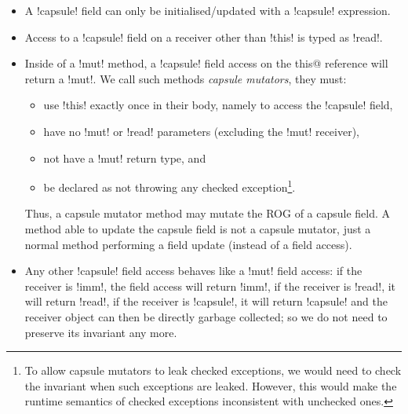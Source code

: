 \begin{itemize}
	\item A \Q!capsule! field can only be initialised/updated with a \Q!capsule! expression.
\item Access to a \Q!capsule! field on a receiver other than \Q!this! is typed as \Q!read!.
\item 
Inside of a \Q!mut! method,
a \Q!capsule! field access 
on the \Q@mut this@ reference will return a \Q!mut!.
We call such methods \emph{capsule mutators}, they must:
\begin{itemize}
		\item use \Q!this! exactly once in their body, namely to access the \Q!capsule! field,
		\item have no \Q!mut! or \Q!read! parameters (excluding the \Q!mut! receiver),
		\item not have a \Q!mut! return type, and
		\item be declared as not throwing any checked exception\footnote{To allow capsule mutators to leak checked exceptions, we would need to check the invariant when such exceptions are leaked. However, this would make the runtime semantics of checked exceptions inconsistent with unchecked ones.}.
	\end{itemize}	
Thus, a capsule mutator method may mutate the ROG of a capsule field. A method able to update the capsule field is not a capsule mutator, just a normal method performing a \Q@capsule@ field update (instead of a field access).
	\item Any other \Q!capsule! field access behaves like a \Q!mut! field access: if the receiver is \Q!imm!, the field access will return \Q!imm!, if the receiver is \Q!read!, it will return \Q!read!, if the receiver is \Q!capsule!, it will return \Q!capsule! and
the \Q@capsule@ receiver object can then be directly garbage collected; so we do not need to preserve its invariant any more. %
	
\end{itemize}

